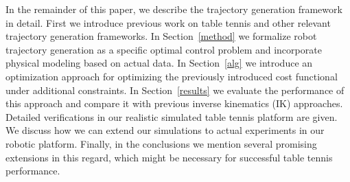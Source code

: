 In the remainder of this paper, we describe the trajectory generation framework in detail. First we introduce previous work on table tennis and other relevant trajectory generation frameworks. In Section~\ref{method} we formalize robot trajectory generation as a specific optimal control problem and incorporate physical modeling based on actual data. In Section~\ref{alg} we introduce an optimization approach for optimizing the previously introduced cost functional under additional constraints. In Section~\ref{results} we evaluate the performance of this approach and compare it with previous inverse kinematics (IK) approaches. Detailed verifications in our realistic simulated table tennis platform are given. We discuss how we can extend our simulations to actual experiments in our robotic platform. Finally, in the conclusions we mention several promising extensions in this regard, which might be necessary for successful table tennis performance. %


